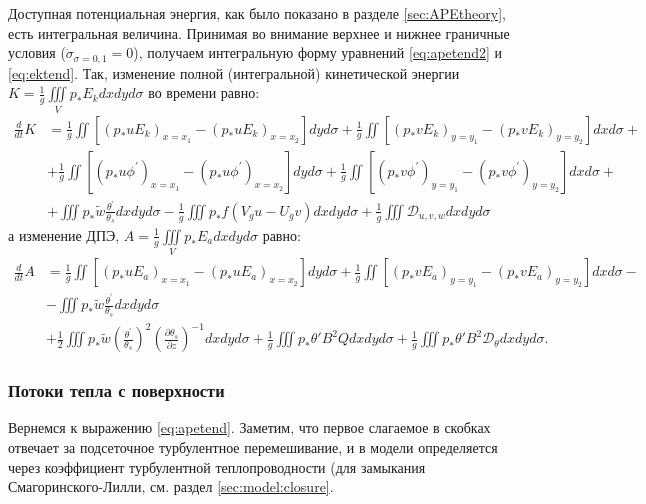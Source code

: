 Доступная потенциальная энергия, как было показано в разделе \ref{sec:APEtheory}, есть интегральная величина. Принимая во внимание верхнее и нижнее граничные условия ($\dot{\sigma}_{\sigma=0,1}=0$), получаем интегральную форму уравнений \eqref{eq:apetend2} и \eqref{eq:ektend}. Так, изменение полной (интегральной) кинетической энергии $K=\frac{1}{g}\iiint\limits_V p_*E_k dxdyd\sigma$ во времени равно:
\begin{align} \label{eq:dKdt}
\frac{d}{dt}K&=\frac{1}{g}\iint\left[(p_*uE_k)_{x=x_1}-(p_*uE_k)_{x=x_2}\right]dyd\sigma + \frac{1}{g}\iint\left[(p_*vE_k)_{y=y_1}-(p_*vE_k)_{y=y_2}\right]dxd\sigma + \nonumber\\ &+\frac{1}{g}\iint\left[(p_*u\phi^\prime)_{x=x_1}-(p_*u\phi^\prime)_{x=x_2}\right]dyd\sigma + \frac{1}{g}\iint\left[(p_*v\phi^\prime)_{y=y_1}-(p_*v\phi^\prime)_{y=y_2}\right] dxd\sigma + \nonumber\\ &+ \iiint p_*\tilde{w}\frac{\theta^\prime}{\theta_s}dxdyd\sigma - \frac{1}{g}\iiint p_*f(V_gu-U_gv) dxdyd\sigma+\frac{1}{g}\iiint \mathcal{D}_{u,v,w}dxdyd\sigma
\end{align}
а изменение ДПЭ, $A=\frac{1}{g}\iiint\limits_V p_*E_a dxdyd\sigma$ равно:
\begin{align} \label{eq:dAdt}
\frac{d}{dt}A&=\frac{1}{g}\iint\left[(p_*uE_a)_{x=x_1}-(p_*uE_a)_{x=x_2}\right]dyd\sigma + \frac{1}{g}\iint\left[(p_*vE_a)_{y=y_1}-(p_*vE_a)_{y=y_2}\right]dxd\sigma - \nonumber\\ &- \iiint p_*\tilde{w}\frac{\theta^\prime}{\theta_s}dxdyd\sigma \nonumber\\
&+ \frac{1}{2}\iiint p_*\tilde{w}\left(\frac{\theta^\prime}{\theta_s}\right)^2\left(\frac{\partial\theta_s}{\partial z}\right)^{-1}dxdyd\sigma+\frac{1}{g}\iiint p_*\theta'B^2Qdxdyd\sigma+\frac{1}{g}\iiint p_*\theta'B^2\mathcal{D}_{\theta}dxdyd\sigma.
\end{align} %

\subsubsection{Потоки тепла с поверхности}
\label{sec:expsetup:hsurf}
Вернемся к выражению \eqref{eq:apetend}. Заметим, что первое слагаемое в скобках отвечает за подсеточное турбулентное перемешивание, и в модели определяется через коэффициент турбулентной теплопроводности (для замыкания Смагоринского-Лилли, см. раздел \ref{sec:model:closure}.

